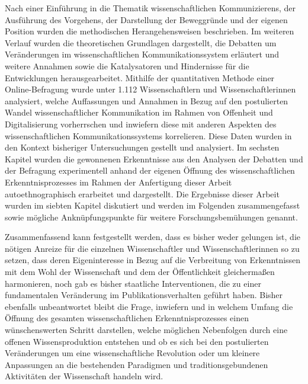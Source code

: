 Nach einer Einführung in die Thematik wissenschaftlichen Kommunizierens, der Ausführung des Vorgehens, der Darstellung der Beweggründe und der eigenen Position wurden die methodischen Herangehensweisen beschrieben. Im weiteren Verlauf wurden die theoretischen Grundlagen dargestellt, die Debatten um Veränderungen im wissenschaftlichen Kommunikationssystem erläutert und weitere Annahmen sowie die Katalysatoren und Hindernisse für die Entwicklungen herausgearbeitet. Mithilfe der quantitativen Methode einer Online-Befragung wurde unter 1.112 Wissenschaftlern und Wissenschaftlerinnen analysiert, welche Auffassungen und Annahmen in Bezug auf den postulierten Wandel wissenschaftlicher Kommunikation im Rahmen von Offenheit und Digitalisierung vorherrschen und inwiefern diese mit anderen Aspekten des wissenschaftlichen Kommunikationssystems korrelieren. Diese Daten wurden in den Kontext bisheriger Untersuchungen gestellt und analysiert. Im sechsten Kapitel wurden die gewonnenen Erkenntnisse aus den Analysen der Debatten und der Befragung experimentell anhand der eigenen Öffnung des wissenschaftlichen Erkenntnisprozesses im Rahmen der Anfertigung dieser Arbeit autoethnographisch erarbeitet und dargestellt. Die Ergebnisse dieser Arbeit wurden im siebten Kapitel diskutiert und werden im Folgenden zusammengefasst sowie mögliche Anknüpfungspunkte für weitere Forschungsbemühungen genannt.

Zusammenfassend kann festgestellt werden, dass es bisher weder gelungen ist, die nötigen Anreize für die einzelnen Wissenschaftler und Wissenschaftlerinnen so zu setzen, dass deren Eigeninteresse in Bezug auf die Verbreitung von Erkenntnissen mit dem Wohl der Wissenschaft und dem der Öffentlichkeit gleichermaßen harmonieren, noch gab es bisher staatliche Interventionen, die zu einer fundamentalen Veränderung im Publikationsverhalten geführt haben. Bisher ebenfalls unbeantwortet bleibt die Frage, inwiefern und in welchem Umfang die Öffnung des gesamten wissenschaftlichen Erkenntnisprozesses einen wünschenswerten Schritt darstellen, welche möglichen Nebenfolgen durch eine offenen Wissensproduktion entstehen und ob es sich bei den postulierten Veränderungen um eine wissenschaftliche Revolution oder um kleinere Anpassungen an die bestehenden Paradigmen und traditionsgebundenen Aktivitäten der Wissenschaft handeln wird.

